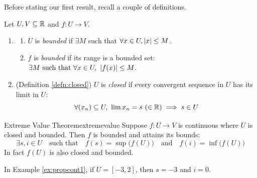 	Before stating our first result, recall a couple of definitions.

\begin{defn}{}{}
Let $U,V\subseteq\mathbb{R}$ and $f:U\to V$.
	\begin{enumerate}
	  \item\begin{enumerate}
	    \item $U$ is \emph{bounded} if $\exists M$ such that $\forall x\in U, \left| x\right|\le M$.
	    \item $f$ is \emph{bounded} if its range is a bounded set: $\exists M\text{ such that }\forall x\in U,\ \nm{f(x)}\le M$.
	  \end{enumerate}
	  \item (Definition \ref{defn:closed}) $U$ is \emph{closed} if every convergent sequence in $U$ has its limit in $U$:
		\[\forall (x_n)\subseteq U,\ \lim x_n=s\ (\in\R)\implies s\in U\]
	\end{enumerate}
\end{defn}

\begin{thm}{Extreme Value Theorem}{extremevalue}
	Suppose $f:U\to V$ is continuous where $U$ is closed and bounded. Then $f$ is bounded and attains its bounds: %
	\[
		\exists s,i\in U\quad \text{such that}\quad f(s)=\sup\bigl(f(U)\bigr)\quad\text{and}\quad	f(i)=\inf\bigl(f(U)\bigr)
	\]
	In fact $f(U)$ is also closed and bounded.
\end{thm}

In Example \ref{ex:propcont1}, if $U=[-3,2]$, then $s=-3$ and $i=0$.


